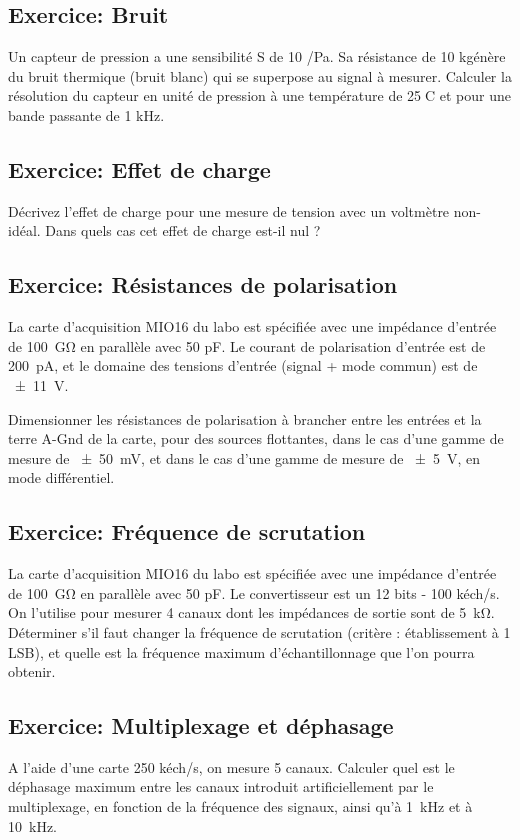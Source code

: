 \documentclass[main.tex]{subfiles}
\begin{document}
\subsection{Exercice: Bruit}
Un capteur de pression a une sensibilité S de 10 \microV/Pa. Sa résistance de 10 k\Omega génère du bruit thermique (bruit blanc) qui se superpose au signal à mesurer.
Calculer la résolution du capteur en unité de pression à une température de 25C et pour une bande passante de 1 kHz.

\subsection{Exercice: Effet de charge}
Décrivez l’effet de charge pour une mesure de tension avec un voltmètre non-idéal.
Dans quels cas cet effet de charge est-il nul ?


\subsection{Exercice: Résistances de polarisation}
La carte d'acquisition MIO16 du labo est spécifiée avec une impédance d'entrée de \SI{100}{\giga\ohm} en parallèle avec 50 pF. Le courant de polarisation d'entrée est de \SI{200}{\pico\ampere}, et le domaine des tensions d'entrée (signal + mode commun) est de \SI{\pm11}{\volt}.

Dimensionner les résistances de polarisation à brancher entre les entrées et la terre A-Gnd de la carte, pour des sources flottantes, dans le cas d'une gamme de mesure de \SI{\pm50}{\milli\volt}, et dans le cas d'une gamme de mesure de \SI{\pm5}{\volt}, en mode différentiel.

\subsection{Exercice: Fréquence de scrutation}
La carte d'acquisition MIO16 du labo est spécifiée avec une impédance d'entrée de \SI{100}{\giga\ohm} en parallèle avec 50 pF. Le convertisseur est un 12 bits - 100 kéch/s. On l'utilise pour mesurer 4 canaux dont les impédances de sortie sont de \SI{5}{\kilo\ohm}. Déterminer s'il faut changer la fréquence de scrutation (critère : établissement à 1 LSB), et quelle est la fréquence maximum d'échantillonnage que l'on pourra obtenir.

\subsection{Exercice: Multiplexage et déphasage}
A l'aide d'une carte 250 kéch/s, on mesure 5 canaux. Calculer quel est le déphasage maximum entre les canaux introduit artificiellement par le multiplexage, en fonction de la fréquence des signaux, ainsi qu'à \SI{1}{\kilo\hertz} et à \SI{10}{\kilo\hertz}.

\fi
\end{document}
